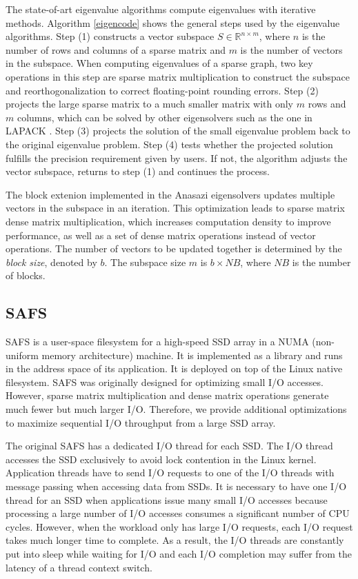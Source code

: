 The state-of-art eigenvalue algorithms compute eigenvalues with iterative
methods. Algorithm \ref{eigencode} shows the general steps used by the eigenvalue
algorithms.
Step (1) constructs a vector subspace $S \in \mathbb{R}^{n \times m}$, where
$n$ is the number of rows and columns of a sparse matrix and $m$ is the number
of vectors in the subspace. When computing eigenvalues of a sparse graph,
two key operations in this step are sparse matrix multiplication to construct
the subspace and reorthogonalization to correct floating-point rounding errors.
Step (2) projects the large sparse matrix to a much smaller matrix with only
$m$ rows and $m$ columns, which can be solved by other eigensolvers such as
the one in LAPACK \cite{lapack}. Step (3) projects the solution of the small
eigenvalue problem back to the original eigenvalue problem. Step (4) tests
whether the projected solution fulfills the precision requirement given by
users. If not, the algorithm adjusts the vector subspace, returns to step (1)
and continues the process.

The block extenion implemented in the Anasazi eigensolvers updates multiple
vectors in the subspace in an iteration. This optimization leads to sparse
matrix dense matrix multiplication, which increases computation density to
improve performance, as well as a set of dense matrix operations instead of
vector operations. The number of vectors to be updated together is determined
by the \textit{block size}, denoted by $b$. The subspace size $m$
is $b \times NB$, where $NB$ is the number of blocks.

\subsection{SAFS}

SAFS \cite{safs} is a user-space filesystem for a high-speed SSD array in
a NUMA (non-uniform memory architecture) machine. It is implemented as
a library and runs in the address space
of its application. It is deployed on top of the Linux native filesystem.
SAFS was originally designed for optimizing small I/O accesses. However,
sparse matrix multiplication and dense matrix operations
generate much fewer but much larger I/O. Therefore, we provide additional
optimizations to maximize sequential I/O throughput from a large SSD array.

The original SAFS has a dedicated I/O thread for each SSD. The I/O thread
accesses the SSD exclusively to avoid lock contention in the Linux kernel.
Application threads have to send I/O requests to one of the I/O threads
with message passing when accessing data from SSDs. It is necessary to have
one I/O thread for
an SSD when applications issue many small I/O accesses because processing
a large number of I/O accesses consumes a significant number of CPU cycles.
However, when the workload only has large I/O requests, each I/O request takes
much longer time to complete. As a result, the I/O threads are constantly put
into sleep while waiting for I/O and each I/O completion may suffer from
the latency of a thread context switch.

